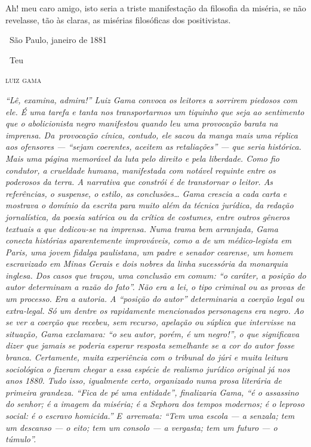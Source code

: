 {Ah! meu caro amigo, isto seria a triste manifestação da filosofia da
miséria, se não revelasse, tão às claras, as misérias filosóficas dos
positivistas.

\medskip

\hfill\ São Paulo, janeiro de 1881

\hfill\ Teu

\hfill\textsc{luiz gama}


\begin{resumo}
\emph{``Lê, examina, admira!'' Luiz Gama convoca os leitores a sorrirem
piedosos com ele. É uma tarefa e tanta nos transportarmos um tiquinho
que seja ao sentimento que o abolicionista negro manifestou quando leu
uma provocação barata na imprensa. Da~provocação cínica, contudo, ele
sacou da manga mais uma réplica aos ofensores --- ``sejam coerentes,
aceitem as retaliações'' --- que seria histórica. Mais uma página
memorável da luta pelo direito e pela liberdade. Como fio condutor, a
crueldade humana, manifestada com notável requinte entre os poderosos da
terra. A narrativa que constrói é de transtornar o leitor. As
referências, o suspense, o estilo, as conclusões\ldots{} Gama crescia a cada
carta e mostrava o domínio da escrita para muito além da técnica
jurídica, da redação jornalística, da poesia satírica ou da crítica de
costumes, entre outros gêneros textuais a que dedicou-se na imprensa.
Numa trama bem arranjada, Gama conecta histórias aparentemente
improváveis, como a de um médico-legista em Paris, uma jovem fidalga
paulistana, um padre e senador cearense, um homem escravizado em Minas
Gerais e dois nobres da linha sucessória da monarquia inglesa. Dos casos
que traçou, uma conclusão em comum: ``o caráter, a posição do autor
determinam a razão do fato''. Não era a lei, o tipo criminal ou as provas
de um processo. Era a autoria. A ``posição do autor'' determinaria a
coerção legal ou extra-legal. Só um dentre os rapidamente mencionados
personagens era negro. Ao se ver a coerção que recebeu, sem recurso,
apelação ou súplica que intervisse na situação, Gama exclamava: ``o seu
autor, porém, é um negro!'', o que significava dizer que jamais se
poderia esperar resposta semelhante se a cor do autor fosse branca.
Certamente, muita experiência com o tribunal do júri e muita leitura
sociológica o fizeram chegar a essa espécie de realismo jurídico
original já nos anos 1880. Tudo isso, igualmente certo, organizado numa
prosa literária de primeira grandeza. ``Fica de pé uma entidade'',
finalizaria Gama, ``é o assassino do senhor; é a imagem da miséria; é a
Sephora dos tempos modernos; é o leproso social: é o escravo homicida.''
E~arremata: ``Tem uma escola --- a senzala; tem um descanso --- o eito; tem
um consolo --- a vergasta; tem um futuro --- o túmulo''. }
\end{resumo}

}
